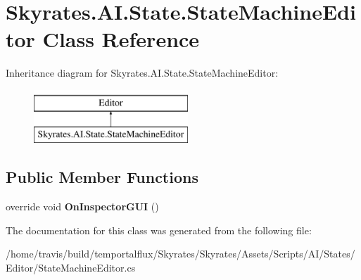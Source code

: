 \hypertarget{class_skyrates_1_1_a_i_1_1_state_1_1_state_machine_editor}{\section{Skyrates.\-A\-I.\-State.\-State\-Machine\-Editor Class Reference}
\label{class_skyrates_1_1_a_i_1_1_state_1_1_state_machine_editor}
}
Inheritance diagram for Skyrates.\-A\-I.\-State.\-State\-Machine\-Editor\-:\begin{figure}[H]
\begin{center}
\leavevmode
\includegraphics[height=2.000000cm]{class_skyrates_1_1_a_i_1_1_state_1_1_state_machine_editor}
\end{center}
\end{figure}
\subsection*{Public Member Functions}
\begin{DoxyCompactItemize}
\item 
\hypertarget{class_skyrates_1_1_a_i_1_1_state_1_1_state_machine_editor_a68a205b66e08afa135797a00ed371b49}{override void {\bfseries On\-Inspector\-G\-U\-I} ()}\label{class_skyrates_1_1_a_i_1_1_state_1_1_state_machine_editor_a68a205b66e08afa135797a00ed371b49}

\end{DoxyCompactItemize}


The documentation for this class was generated from the following file\-:\begin{DoxyCompactItemize}
\item 
/home/travis/build/temportalflux/\-Skyrates/\-Skyrates/\-Assets/\-Scripts/\-A\-I/\-States/\-Editor/State\-Machine\-Editor.\-cs\end{DoxyCompactItemize}
